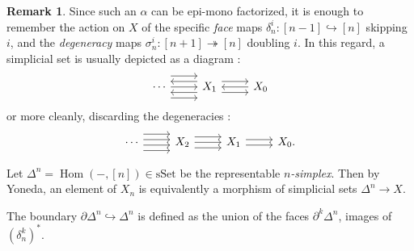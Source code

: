 \documentclass[11pt]{article}
\theoremstyle{definition}
\newtheorem{remark}{Remark}
\newcommand{\Hom}{\operatorname{Hom}}
\newcommand{\sSet}{\mathrm{sSet}}
\begin{document}
\begin{remark}
    Since such an $\alpha$ can be epi-mono factorized, it is enough to remember the action on $X$ of the specific \emph{face} maps $\delta_n^i : [n-1] \hookrightarrow [n]$ skipping $i$, and the \emph{degeneracy} maps $\sigma_n^i : [n+1] \twoheadrightarrow [n]$ doubling $i$.
    In this regard, a simplicial set is usually depicted as a diagram :
    \[\begin{tikzcd}
        \cdots & {X_1} & {X_0}
        \arrow[from=1-1, to=1-2]
        \arrow[shift right=4, from=1-1, to=1-2]
        \arrow[shift left=4, from=1-1, to=1-2]
        \arrow[shift left=2, from=1-2, to=1-1]
        \arrow[shift right=2, from=1-2, to=1-1]
        \arrow[shift left=2, from=1-2, to=1-3]
        \arrow[shift right=2, from=1-2, to=1-3]
        \arrow[from=1-3, to=1-2]
    \end{tikzcd}\]
    or more cleanly, discarding the degeneracies :
    \[\begin{tikzcd}
        \cdots & {X_2} & {X_1} & {X_0.}
        \arrow[shift left, from=1-1, to=1-2]
        \arrow[shift left=3, from=1-1, to=1-2]
        \arrow[shift right, from=1-1, to=1-2]
        \arrow[shift right=3, from=1-1, to=1-2]
        \arrow[from=1-2, to=1-3]
        \arrow[shift left=2, from=1-2, to=1-3]
        \arrow[shift right=2, from=1-2, to=1-3]
        \arrow[shift left, from=1-3, to=1-4]
        \arrow[shift right, from=1-3, to=1-4]
    \end{tikzcd}\]
\end{remark}

Let $\Delta^n = \Hom(-, [n]) \in \sSet$ be the representable \emph{$n$-simplex}.
Then by Yoneda, an element of $X_n$ is equivalently a morphism of simplicial sets $\Delta^n \to X$.

The boundary $\partial \Delta^n \hookrightarrow \Delta^n$ is defined as the union of the faces $\partial^k \Delta^n$, images of $(\delta_n^k)^*$.
\end{document}
